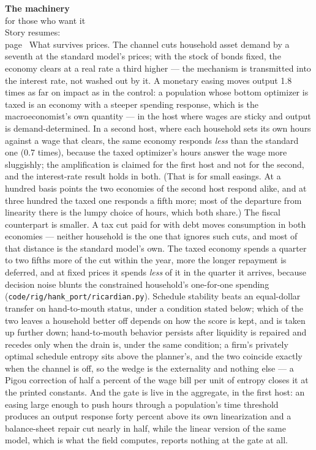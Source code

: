 \begin{machinery}{\textbf{The machinery}\\for those who want it\\[3pt]{\color{muted}Story resumes:\\page~\pageref{ch15}}}
What survives prices. The channel cuts household asset demand by a
seventh at the standard model's prices; with the stock of bonds fixed,
the economy clears at a real rate a third higher --- the mechanism is
transmitted into the interest rate, not washed out by it. A monetary
easing moves output 1.8 times as far on impact as in the control: a
population whose bottom optimizer is taxed is an economy with a
steeper spending response, which is the macroeconomist's own
quantity --- in the host where wages are sticky and output is
demand-determined. In a second host, where each household sets its own
hours against a wage that clears, the same economy responds \emph{less} than
the standard one (0.7 times), because the taxed optimizer's hours
answer the wage more sluggishly; the amplification is claimed for the
first host and not for the second, and the interest-rate result holds
in both. (That is for small easings. At a hundred basis points the two
economies of the second host respond alike, and at three hundred the
taxed one responds a fifth more; most of the departure from linearity
there is the lumpy choice of hours, which both share.) The fiscal
counterpart is smaller. A tax cut paid for with debt moves consumption
in both economies --- neither household is the one that ignores such
cuts, and most of that distance is the standard model's own. The taxed
economy spends a quarter to two fifths more of the cut within the
year, more the longer repayment is deferred, and at fixed prices it
spends \emph{less} of it in the quarter it arrives, because decision noise
blunts the constrained household's one-for-one spending
(\texttt{code/\allowbreak{}rig/\allowbreak{}hank\_\allowbreak{}port/\allowbreak{}ricardian.\allowbreak{}py}). Schedule stability beats an equal-dollar transfer on
hand-to-mouth status, under a condition stated below; which of the two
leaves a household better off depends on how the score is kept, and is
taken up further down;
hand-to-mouth behavior persists after liquidity is repaired and
recedes only when the drain is, under the same condition; a firm's
privately optimal schedule entropy sits above the planner's,
and the two coincide exactly when the channel is off, so the wedge is
the externality and nothing else --- a Pigou correction of half a
percent of the wage bill per unit of entropy closes it at the printed
constants. And the gate is live in the aggregate, in the first host:
an easing large enough to push hours through a population's time
threshold produces an output
response forty percent above its own linearization and a
balance-sheet repair cut nearly in half, while the linear version of
the same model, which is what the field computes, reports nothing at
the gate at all.


\end{machinery}
